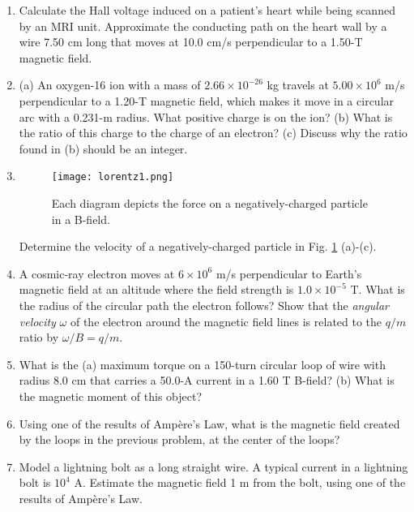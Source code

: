 \documentclass[10pt]{article}
\begin{document}
\begin{enumerate}
\begin{enumerate}
\item Calculate the Hall voltage induced on a patient’s heart while being scanned by an MRI unit. Approximate the conducting path on the heart wall by a wire 7.50 cm long that moves at 10.0 cm/s perpendicular to a 1.50-T magnetic field. \\ \vspace{2cm}
\item (a) An oxygen-16 ion with a mass of $2.66\times 10^{−26}$ kg travels at $5.00 \times 10^{6}$ m/s perpendicular to a 1.20-T magnetic field, which makes it move in a circular arc with a 0.231-m radius. What positive charge is on the ion? (b) What is the ratio of this charge to the charge of an electron? (c) Discuss why the ratio found in (b) should be an integer. \\ \vspace{2cm}
\item 
\begin{figure}[ht]
\centering
\texttt{[image: lorentz1.png]}
\caption{\label{fig:lorentz1} Each diagram depicts the force on a negatively-charged particle in a B-field.}
\end{figure}
Determine the velocity of a negatively-charged particle in Fig. \ref{fig:lorentz1} (a)-(c). \\ \vspace{1cm}
\item A cosmic-ray electron moves at $6 \times 10^6$ m/s perpendicular to Earth’s magnetic field at an altitude where the field strength is $1.0 \times 10^{-5}$ T. What is the radius of the circular path the electron follows?  Show that the \textit{angular velocity} $\omega$ of the electron around the magnetic field lines is related to the $q/m$ ratio by $\omega/B = q/m$. \\ \vspace{1.5 cm}
\item What is the (a) maximum torque on a 150-turn circular loop of wire with radius 8.0 cm that carries a 50.0-A current in a 1.60 T B-field? (b) What is the magnetic moment of this object? \\ \vspace{2 cm}
\item Using one of the results of Amp\`{e}re's Law, what is the magnetic field created by the loops in the previous problem, at the center of the loops? \\ \vspace{2cm}
\item Model a lightning bolt as a long straight wire.  A typical current in a lightning bolt is $10^4$ A. Estimate the magnetic field 1 m from the bolt, using one of the results of Amp\`{e}re's Law. \\ \vspace{2cm}

\end{enumerate}
\end{enumerate}
\end{document}
